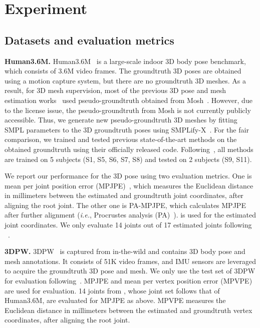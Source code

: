 \documentclass[runningheads]{llncs}
\begin{document}
\section{Experiment}
\vspace{-1mm}
\subsection{Datasets and evaluation metrics}
\textbf{Human3.6M.}
Human3.6M~\cite{ionescu2014human3} is a large-scale indoor 3D body pose benchmark, which consists of 3.6M video frames. 
The groundtruth 3D poses are obtained using a motion capture system, but there are no groundtruth 3D meshes.
As a result, for 3D mesh supervision, most of the previous 3D pose and mesh estimation works~\cite{kanazawa2018hmr,kolotouros2019cmr,kolotouros2019spin} used pseudo-groundtruth obtained from Mosh~\cite{loper2014mosh}.
However, due to the license issue, the pseudo-groundtruth from Mosh is not currently publicly accessible.
Thus, we generate new pseudo-groundtruth 3D meshes by fitting SMPL parameters to the 3D groundtruth poses using SMPLify-X~\cite{pavlakos2019expressive}.
For the fair comparison, we trained and tested previous state-of-the-art methods on the obtained groundtruth using their officially released code.
Following~\cite{pavlakos2017cf,kanazawa2018hmr}, all methods are trained on 5 subjects (S1, S5, S6, S7, S8) and tested on 2 subjects (S9, S11).

We report our performance for the 3D pose using two evaluation metrics.
One is mean per joint position error (MPJPE)~\cite{ionescu2014human3}, which measures the Euclidean distance in millimeters between the estimated and groundtruth joint coordinates, after aligning the root joint.
The other one is PA-MPJPE, which calculates MPJPE after further alignment (\textit{i.e.}, Procrustes analysis (PA)~\cite{gower1975generalized}).
 is used for the estimated joint coordinates.
We only evaluate 14 joints out of 17 estimated joints following ~\cite{kanazawa2018hmr,pavlakos2018l3d,kolotouros2019cmr,kolotouros2019spin}.

\noindent\textbf{3DPW.}
3DPW~\cite{von20183dpw} is captured from in-the-wild and contains 3D body pose and mesh annotations.
It consists of 51K video frames, and IMU sensors are leveraged to acquire the groundtruth 3D pose and mesh.
We only use the test set of 3DPW for evaluation following~\cite{kolotouros2019spin}.
MPJPE and mean per vertex position error (MPVPE) are used for evaluation.
14 joints from , whose joint set follows that of Human3.6M, are evaluated for MPJPE as above.
MPVPE measures the Euclidean distance in millimeters between the estimated and groundtruth vertex coordinates, after aligning the root joint.
\end{document}
